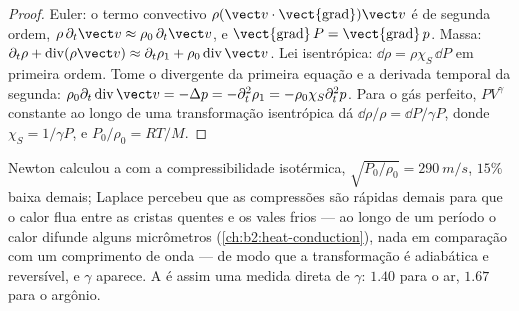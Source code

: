 \begin{proof}
Euler: o termo convectivo $\rho(\vect v\cdot\operatorname{\vect{grad}})\vect v$
é de segunda ordem, $\rho\,\partial_t\vect v \approx \rho_0\,\partial_t\vect v$, e
$\operatorname{\vect{grad}}P = \operatorname{\vect{grad}}p$. Massa: $\partial_t\rho +
\operatorname{div}(\rho\vect v) \approx \partial_t\rho_1 + \rho_0\operatorname{div}\vect v$.
Lei isentrópica: $\dd\rho = \rho\chi_S\,\dd P$ em primeira ordem. Tome o
divergente da primeira equação e a derivada temporal da segunda:
$\rho_0\partial_t\operatorname{div}\vect v = -\Delta p = -\partial_t^2\rho_1 = -\rho_0\chi_S
\partial_t^2p$. Para o gás perfeito, $PV^\gamma$ constante ao longo de uma transformação
isentrópica dá $\dd\rho/\rho = \dd P/\gamma P$, donde $\chi_S = 1/\gamma P$,
e $P_0/\rho_0 = RT/M$.
\end{proof}

\begin{remark}\label{rem:b2:sound-waves:laplace}
Newton calculou a  com a compressibilidade isotérmica,
$\sqrt{P_0/\rho_0} = \qty{290}{m/s}$, $15\%$ baixa demais; Laplace percebeu que as
compressões são rápidas demais para que o calor flua entre as cristas quentes e
os vales frios --- ao longo de um período o calor difunde alguns micrômetros
(\cref{ch:b2:heat-conduction}), nada em comparação com um comprimento de onda ---
de modo que a transformação é adiabática e reversível, e $\gamma$ aparece.
A  é assim uma medida direta de $\gamma$: $1.40$ para o
ar, $1.67$ para o argônio.
\end{remark}

